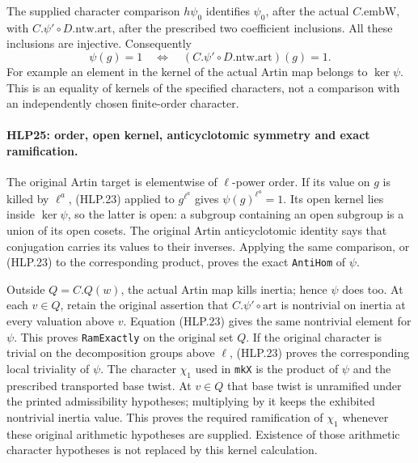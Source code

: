 The supplied character comparison \(h\psi_0\) identifies
\(\psi_0\), after the actual \(C.\mathrm{embW}\), with
\(C.\psi'\circ D.\mathrm{ntw.art}\), after the prescribed two
coefficient inclusions. All these inclusions are injective.
Consequently
\[
    \psi(g)=1
       \quad\Longleftrightarrow\quad
        (C.\psi'\circ D.\mathrm{ntw.art})(g)=1.       \tag{HLP.23}
\]
For example an element in the kernel of the actual Artin map
belongs to \(\ker\psi\). This is an equality of kernels of the
specified characters, not a comparison with an independently
chosen finite-order character.

\paragraph{HLP25: order, open kernel, anticyclotomic symmetry and exact ramification.}
\label{claim:HLP25}
The original Artin target is elementwise of \(\ell\)-power order.
If its value on \(g\) is killed by \(\ell^a\), (HLP.23) applied
to \(g^{\ell^a}\) gives \(\psi(g)^{\ell^a}=1\).
Its open kernel lies inside \(\ker\psi\), so the latter is open:
a subgroup containing an open subgroup is a union of its open
cosets. The original Artin anticyclotomic identity says that
conjugation carries its values to their inverses. Applying the
same comparison, or (HLP.23) to the corresponding product, proves
the exact \texttt{AntiHom} of \(\psi\).

Outside \(Q=C.Q(w)\), the actual Artin map kills inertia; hence
\(\psi\) does too. At each \(v\in Q\), retain the original
assertion that \(C.\psi'\circ\mathrm{art}\) is nontrivial on
inertia at every valuation above \(v\). Equation (HLP.23) gives
the same nontrivial element for \(\psi\). This proves
\texttt{RamExactly} on the original set \(Q\). If the original
character is trivial on the decomposition groups above \(\ell\),
(HLP.23) proves the corresponding local triviality of \(\psi\).
The character \(\chi_1\) used in \texttt{mkX} is the product of
\(\psi\) and the prescribed transported base twist. At \(v\in Q\)
that base twist is unramified under the printed admissibility
hypotheses; multiplying by it keeps the exhibited nontrivial
inertia value. This proves the required ramification of
\(\chi_1\) whenever these original arithmetic hypotheses are
supplied. Existence of those arithmetic character hypotheses is
not replaced by this kernel calculation.

